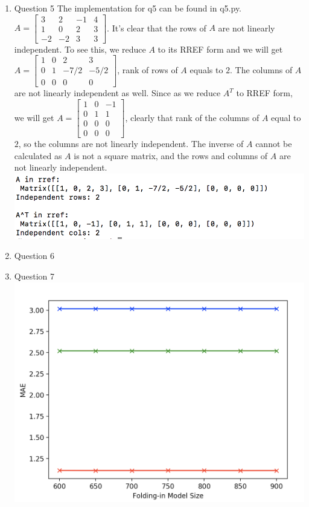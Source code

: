 \documentclass[11pt]{article}
\begin{document}
\begin{enumerate}
\item Question 5\newline
The implementation for q5 can be found in q5.py. $A = \begin{bmatrix} 3 & 2 & -1 & 4 \\ 1 & 0 & 2 & 3 \\ -2 & -2 & 3 & 3\end{bmatrix}$. It's clear that the rows of $A$ are not linearly independent. To see this, we reduce $A$ to its RREF form and we will get $A = \begin{bmatrix} 1 & 0 & 2 & 3 \\ 0 & 1 & -7/2 & -5/2 \\ 0 & 0 & 0 & 0\end{bmatrix}$, rank of rows of $A$ equals to $2$. The columns of $A$ are not linearly independent as well. Since as we reduce $A^T$ to RREF form, we will get $A = \begin{bmatrix} 1 &0 & -1 \\ 0 & 1 & 1 \\ 0 & 0 & 0 \\ 0 & 0 & 0\end{bmatrix}$, clearly that rank of the columns of $A$ equal to $2$, so the columns are not linearly independent. The inverse of $A$ cannot be calculated as $A$ is not a square matrix, and the rows and columns of $A$ are not linearly independent.\\
\includegraphics{q5_result}

\item Question 6\newline

\item Question 7\newline
\includegraphics[width=0.7\columnwidth]{q7_result}

\end{enumerate}
\end{document}
